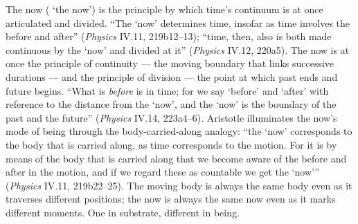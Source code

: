 The now ( `the now') is the principle by which time's continuum is at once articulated and divided. ``The `now' determines time, insofar as time involves the before and after'' (\textit{Physics} IV.11, 219b12--13); ``time, then, also is both made continuous by the `now' and divided at it'' (\textit{Physics} IV.12, 220a5). The now is at once the principle of continuity --- the moving boundary that links successive durations --- and the principle of division --- the point at which past ends and future begins. ``What is \textit{before} is in time; for we say `before' and `after' with reference to the distance from the `now', and the `now' is the boundary of the past and the future'' (\textit{Physics} IV.14, 223a4--6). Aristotle illuminates the now's mode of being through the body-carried-along analogy: ``the `now' corresponds to the body that is carried along, as time corresponds to the motion. For it is by means of the body that is carried along that we become aware of the before and after in the motion, and if we regard these as countable we get the `now''' (\textit{Physics} IV.11, 219b22--25). The moving body is always the same body even as it traverses different positions; the now is always the same now even as it marks different moments. One in substrate, different in being.

